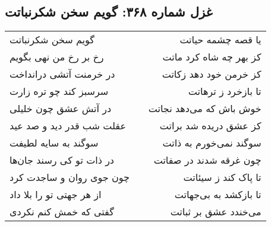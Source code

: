 \begin{center}
\section*{غزل شماره ۳۶۸: گویم سخن شکرنباتت}
\label{sec:0368}
\begin{longtable}{l p{0.5cm} r}
گویم سخن شکرنباتت
&&
یا قصه چشمه حیاتت
\\
رخ بر رخ من نهی بگویم
&&
کز بهر چه شاه کرد ماتت
\\
در خرمنت آتشی درانداخت
&&
کز خرمن خود دهد زکاتت
\\
سرسبز کند چو تره زارت
&&
تا بازخرد ز ترهاتت
\\
در آتش عشق چون خلیلی
&&
خوش باش که می‌دهد نجاتت
\\
عقلت شب قدر دید و صد عید
&&
کز عشق دریده شد براتت
\\
سوگند به سایه لطیفت
&&
سوگند نمی‌خورم به ذاتت
\\
در ذات تو کی رسند جان‌ها
&&
چون غرقه شدند در صفاتت
\\
چون جوی روان و ساجدت کرد
&&
تا پاک کند ز سیئاتت
\\
از هر جهتی تو را بلا داد
&&
تا بازکشد به بی‌جهاتت
\\
گفتی که خمش کنم نکردی
&&
می‌خندد عشق بر ثباتت
\\
\end{longtable}
\end{center}
